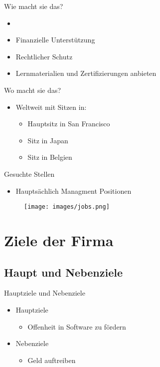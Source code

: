 \documentclass[11pt,aspectratio=169]{beamer}
\begin{document}
\begin{frame}{Wie macht sie das?}
	\begin{itemize}
		\item <1->\cite{Grundprinziepe}
		\item <2->Finanzielle Unterstützung
		\item <3->Rechtlicher Schutz
		\item <4->Lernmaterialien und Zertifizierungen anbieten\cite{Training}
	\end{itemize}
\end{frame}
\begin{frame}{Wo macht sie das?}
	\begin{itemize}
		\item Weltweit mit Sitzen in:
		      \begin{itemize}
			      \item Hauptsitz in San Francisco \cite{Locations}
			      \item Sitz in Japan\cite{Locations}
			      \item Sitz in Belgien\cite{Locations}
		      \end{itemize}
	\end{itemize}
\end{frame}
\begin{frame}{Gesuchte Stellen} \begin{itemize}

		\item	Hauptsächlich Managment Positionen
	\end{itemize}
	\begin{figure}
		\centering
		\texttt{[image: images/jobs.png]}\cite{Positionen}
	\end{figure}

\end{frame}
\section {Ziele der Firma}
\subsection {Haupt und Nebenziele}
\begin{frame}{Hauptziele und Nebenziele}
	\begin{itemize}
		\item <1-> Hauptziele
		      \begin{itemize}
			      \item<2->Offenheit in Software zu fördern\cite{Grundprinziepe}
		      \end{itemize}
	\end{itemize}
	\begin{itemize}
		\item <3-> Nebenziele
		      \begin{itemize}
			      \item<4->Geld auftreiben
		      \end{itemize}
	\end{itemize}
\end{frame}
\end{document}
